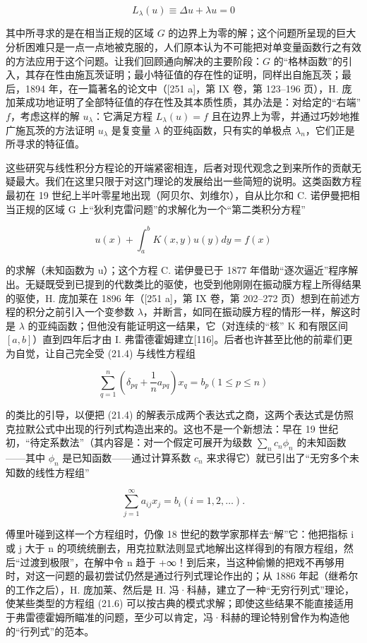 \[
L _ {\lambda} (u) \equiv \Delta u + \lambda u = 0\tag{21.3}
\]

其中所寻求的是在相当正规的区域 \(G\) 的边界上为零的解；这个问题所呈现的巨大分析困难只是一点一点地被克服的，人们原本认为不可能把对单变量函数行之有效的方法应用于这个问题。让我们回顾通向解决的主要阶段：\(G\) 的“格林函数”的引入，其存在性由施瓦茨证明；最小特征值的存在性的证明，同样出自施瓦茨；最后，1894 年，在一篇著名的论文中（{[}251 a{]}，第 IX 卷，第 123–196 页），H. 庞加莱成功地证明了全部特征值的存在性及其本质性质，其办法是：对给定的“右端” \(f\)，考虑这样的解 \(u_{\lambda}\)：它满足方程 \(L_{\lambda}(u) = f\) 且在边界上为零，并通过巧妙地推广施瓦茨的方法证明 \(u_{\lambda}\) 是复变量 \(\lambda\) 的亚纯函数，只有实的单极点 \(\lambda_n\)，它们正是所寻求的特征值。

这些研究与线性积分方程论的开端紧密相连，后者对现代观念之到来所作的贡献无疑最大。我们在这里只限于对这门理论的发展给出一些简短的说明。这类函数方程最初在 19 世纪上半叶零星地出现（阿贝尔、刘维尔），自从比尔和 C. 诺伊曼把相当正规的区域 G 上“狄利克雷问题”的求解化为一个“第二类积分方程”

\[
u (x) + \int_ {a} ^ {b} K (x, y) u (y) d y = f (x)\tag{21.4}
\]

的求解（未知函数为 u）；这个方程 C. 诺伊曼已于 1877 年借助“逐次逼近”程序解出。无疑既受到已提到的代数类比的驱使，也受到他刚刚在振动膜方程上所得结果的驱使，H. 庞加莱在 1896 年（{[}251 a{]}，第 IX 卷，第 202–272 页）想到在前述方程的积分之前引入一个变参数 \(\lambda\)，并断言，如同在振动膜方程的情形一样，解这时是 \(\lambda\) 的亚纯函数；但他没有能证明这一结果，它（对连续的“核” K 和有限区间 \([a, b]\)）直到四年后才由 I. 弗雷德霍姆建立{[}116{]}。后者也许甚至比他的前辈们更为自觉，让自己完全受 (21.4) 与线性方程组

\[
\sum_ {q = 1} ^ {n} \left(\delta_ {p q} + \frac {1}{n} a _ {p q}\right) x _ {q} = b _ {p} (1 \leq p \leq n)\tag{21.5}
\]

的类比的引导，以便把 (21.4) 的解表示成两个表达式之商，这两个表达式是仿照克拉默公式中出现的行列式构造出来的。这也不是一个新想法：早在 19 世纪初，“待定系数法”（其内容是：对一个假定可展开为级数 \(\sum_{n} c_{n} \phi_{n}\) 的未知函数——其中 \(\phi_{n}\) 是已知函数——通过计算系数 \(c_{n}\) 来求得它）就已引出了“无穷多个未知数的线性方程组”

\[
\sum_ {j = 1} ^ {\infty} a _ {i j} x _ {j} = b _ {i} (i = 1, 2, \dots).\tag{21.6}
\]

傅里叶碰到这样一个方程组时，仍像 18 世纪的数学家那样去“解”它：他把指标 i 或 j 大于 n 的项统统删去，用克拉默法则显式地解出这样得到的有限方程组，然后“过渡到极限”，在解中令 n 趋于 +∞！到后来，当这种偷懒的把戏不再够用时，对这一问题的最初尝试仍然是通过行列式理论作出的；从 1886 年起（继希尔的工作之后），H. 庞加莱、然后是 H. 冯·科赫，建立了一种“无穷行列式”理论，使某些类型的方程组 (21.6) 可以按古典的模式求解；即使这些结果不能直接适用于弗雷德霍姆所瞄准的问题，至少可以肯定，冯·科赫的理论特别曾作为构造他的“行列式”的范本。

